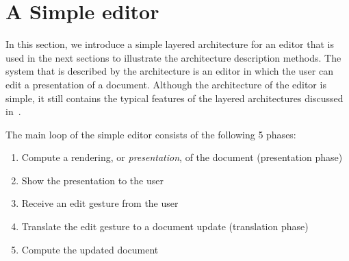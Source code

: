 \section{A Simple editor}

\par In this section, we introduce a simple layered architecture for an
      editor that is used in the next sections to illustrate the architecture
      description methods. The system that is described by the architecture is an
      editor in which the user can edit a presentation of a document. Although the
      architecture of the editor is simple, it still contains the typical features of
      the layered architectures discussed in~\cite{architecture}. 
\par {}The main loop of the simple
      editor consists of the following 5 phases: 
 \begin{enumerate}
 
 \item Compute a rendering, or {\it presentation}, of the document
        (presentation phase)
 \item Show the presentation to the user
 \item Receive an edit gesture from the user
 \item Translate the edit gesture to a document update (translation
        phase)
 \item Compute the updated document
 \end{enumerate}


